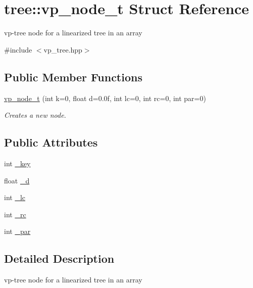 \hypertarget{structtree_1_1vp__node__t}{}\section{tree\+:\+:vp\+\_\+node\+\_\+t Struct Reference}
\label{structtree_1_1vp__node__t}


vp-\/tree node for a linearized tree in an array  




{\ttfamily \#include $<$vp\+\_\+tree.\+hpp$>$}

\subsection*{Public Member Functions}
\begin{DoxyCompactItemize}
\item 
\hyperlink{structtree_1_1vp__node__t_afae7921b2ee4cacf6c1bd2f35f2c0870}{vp\+\_\+node\+\_\+t} (int k=0, float d=0.\+0f, int lc=0, int rc=0, int par=0)
\begin{DoxyCompactList}\small\item\em Creates a new node. \end{DoxyCompactList}\end{DoxyCompactItemize}
\subsection*{Public Attributes}
\begin{DoxyCompactItemize}
\item 
int \hyperlink{structtree_1_1vp__node__t_afb86b117e74d2591551388b2f62d3197}{\+\_\+key}
\item 
float \hyperlink{structtree_1_1vp__node__t_a2a72786ef681fb55e7cc9f1a91a637f5}{\+\_\+d}
\item 
int \hyperlink{structtree_1_1vp__node__t_a36ac11ce1caaf5d34aab924ee27158f4}{\+\_\+lc}
\item 
int \hyperlink{structtree_1_1vp__node__t_a733a0e18db87b13307818a3bbec8e154}{\+\_\+rc}
\item 
int \hyperlink{structtree_1_1vp__node__t_adaed604524e1fac9424ad51e2b0c4484}{\+\_\+par}
\end{DoxyCompactItemize}


\subsection{Detailed Description}
vp-\/tree node for a linearized tree in an array 

